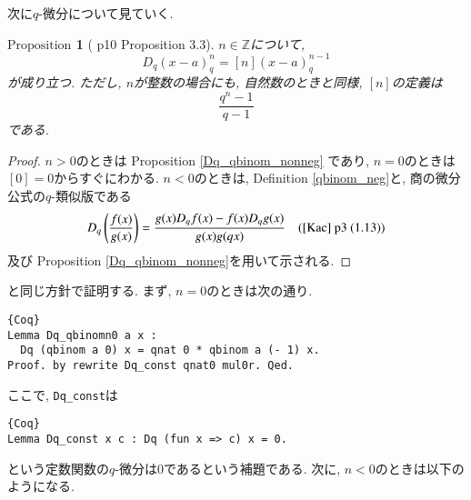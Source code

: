\documentclass[11pt]{jsreport}
\theoremstyle{mystyle}
\newtheorem{prop}[df]{$\textrm{Proposition}$}
\newcommand{\bprop}{\begin{shadebox} \begin{prop}}
\newcommand{\eprop}{\end{prop} \end{shadebox}}
\newcommand{\bpf}{\begin{proof}}
\newcommand{\epf}{\end{proof}}
\newcommand{\Z}{\mathbb{Z}}
\newcommand{\0}{\textbf{0}}
\begin{document}
次に$q$-微分について見ていく.  
\bprop[\cite{Kac} p10 Proposition 3.3]
  $n \in \Z$について, 
  \[
    D_q (x - a)^n_q = [n] (x - a)^{n - 1}_q
  \]
  が成り立つ. ただし, $n$が整数の場合にも, 自然数のときと同様, $[n]$の定義は
  \[
    \frac{q^n - 1}{q - 1}
  \]
  である. 
\eprop
\bpf
  $n > 0$のときは Proposition \ref{Dq_qbinom_nonneg} であり, $n = 0$のときは$[0] = 0$からすぐにわかる. 
  $n < 0$のときは, Definition \ref{qbinom_neg}と, 商の微分公式の$q$-類似版である
  \[
    D_q \left( \frac{f(x)}{g(x)} \right) = \frac{g(x) D_q f(x) - f(x) D_q g(x)}{g(x) g(qx)} \quad
    \text{(\cite{Kac} p3 (1.13))}
  \]
  及び Proposition \ref{Dq_qbinom_nonneg}を用いて示される. 
\epf
\cite{Kac}と同じ方針で証明する. まず, $n = 0$のときは次の通り. 
\begin{lstlisting}{Coq}
Lemma Dq_qbinomn0 a x :
  Dq (qbinom a 0) x = qnat 0 * qbinom a (- 1) x.
Proof. by rewrite Dq_const qnat0 mul0r. Qed. \end{lstlisting}
ここで, {\tt Dq\_const}は
\begin{lstlisting}{Coq}
Lemma Dq_const x c : Dq (fun x => c) x = 0. \end{lstlisting}
という定数関数の$q$-微分は$0$であるという補題である. 次に, $n < 0$のときは以下のようになる. 
\end{document}
